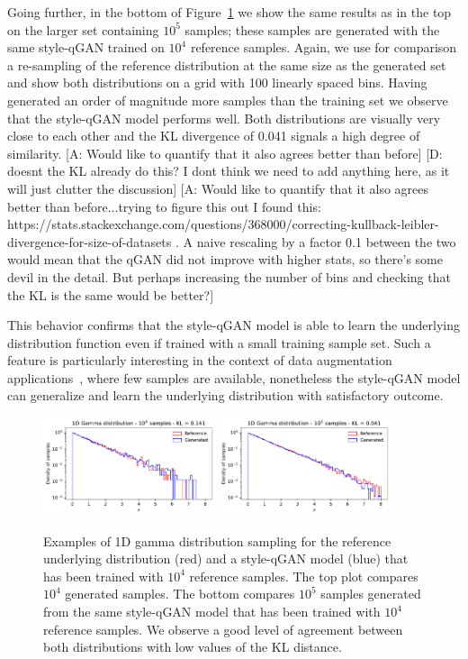 \documentclass[twocolumn,preprintnumbers,superscriptaddress]{revtex4-2}
\newcommand{\commentAF}[1]{{\color{cyan} {[A: #1]}}}
\newcommand{\commentDMG}[1]{{\color{orange} {[D: #1]}}}
\begin{document}
Going further, in the bottom of Figure~\ref{fig:gamma} we show the same results as in the top on the larger set containing $10^5$ samples; these samples are generated with the same style-qGAN trained on $10^4$ reference samples. Again, we use for comparison a re-sampling of the reference distribution at the same size as the generated set and show both distributions on a grid with 100 linearly spaced bins. 
%
Having generated an order of magnitude more samples than the training set we observe that the style-qGAN model performs well. Both distributions are visually very close to each other and the KL divergence of 0.041 signals a high degree of similarity. \commentAF{Would like to quantify that it also agrees better than before}\commentDMG{doesnt the KL already do this? I dont think we need to add anything here, as it will just clutter the discussion}
\commentAF{Would like to quantify that it also agrees better than before...trying to figure this out I found this: https://stats.stackexchange.com/questions/368000/correcting-kullback-leibler-divergence-for-size-of-datasets . A naive rescaling by a factor 0.1 between the two would mean that the qGAN did not improve with higher stats, so there's some devil in the detail. But perhaps increasing the number of bins and checking that the KL is the same would be better?}

%
This behavior confirms that the style-qGAN model is able to learn the underlying
distribution function even if trained with a small training sample set. Such a
feature is particularly interesting in the context of data augmentation
applications~\cite{frid2018synthetic,tanaka2019data}, where few samples are
available, nonetheless the style-qGAN model can generalize and learn the underlying distribution
with satisfactory outcome.


\begin{figure}
  \includegraphics[width=0.45\textwidth]{plots/1Dgamma/1Dgamma_distribution_10k.pdf}
  \includegraphics[width=0.45\textwidth]{plots/1Dgamma/1Dgamma_distribution_100k.pdf}
  \caption{\label{fig:gamma} Examples of 1D gamma distribution sampling for the
  reference underlying distribution (red) and a style-qGAN model (blue) that has been
  trained with $10^4$ reference samples. The top plot compares $10^4$ generated samples. The bottom compares $10^5$ samples generated from the same style-qGAN model that has been trained with $10^4$ reference samples. We observe a good level of agreement between both distributions with low values of the KL distance.}
\end{figure}
\end{document}
